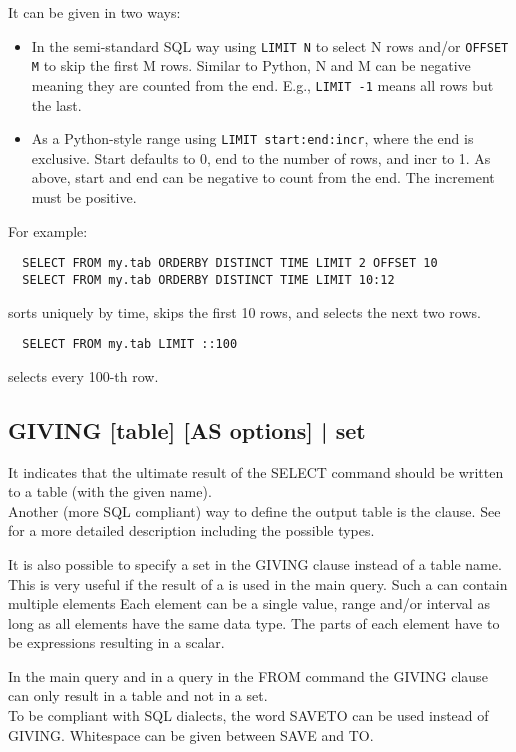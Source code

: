 It can be given in two ways:
\begin{itemize}
\item In the semi-standard SQL way using \texttt{LIMIT N} to select N rows
  and/or \texttt{OFFSET M} to skip the first M rows. Similar to Python, N
  and M can be negative meaning they are counted from the end. E.g.,
  \texttt{LIMIT -1} means all rows but the last.
\item As a Python-style range using \texttt{LIMIT start:end:incr}, where the end is
  exclusive. Start defaults to 0, end to the number of rows, and incr
  to 1. As above, start and end can be negative to count from the
  end. The increment must be positive.
\end{itemize}
For example:
\begin{verbatim}
  SELECT FROM my.tab ORDERBY DISTINCT TIME LIMIT 2 OFFSET 10
  SELECT FROM my.tab ORDERBY DISTINCT TIME LIMIT 10:12
\end{verbatim}
sorts uniquely by time, skips the first 10 rows, and selects the next
two rows.
\begin{verbatim}
  SELECT FROM my.tab LIMIT ::100
\end{verbatim}
selects every 100-th row.

\subsection{\label{TAQL:GIVING}GIVING [table] [AS options] | set}
It indicates that the ultimate result of the SELECT command should be
written to a table (with the given name).
\\Another (more SQL compliant) way to define the output table
is the  clause. See 
for a more detailed description including the possible types.

It is also possible to specify a set in the GIVING clause
instead of a table name. This is very useful if the result of a
 is used in the main query.
Such a  can contain multiple elements
Each element can be a single value, range and/or interval as
long as all elements have the same data type.
The parts of each element have to be expressions resulting in a scalar.

In the main query and in a query in the FROM command the
GIVING clause can only result in a table and not in a set.
\\To be compliant with SQL dialects, the word SAVETO can be
used instead of GIVING. Whitespace can be given between SAVE and TO.
 

